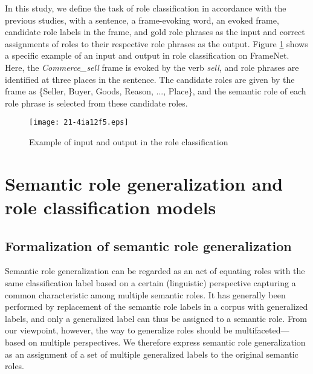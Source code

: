 \documentclass[english]{jnlp_1.4_rep}
\begin{document}
In this study, we define the task of role classification in accordance with the previous studies, with a sentence, a frame-evoking word, an evoked frame, candidate role labels in the frame, and gold role phrases as the input and correct assignments of roles to their respective role phrases as the output.
Figure \ref{fig:input} shows a specific example of an input and output in role classification on FrameNet. Here, the {\it Commerce\_sell} frame is evoked by the verb {\it sell}, and role phrases are identified at three places in the sentence. The candidate roles are given by the frame as \{{\sf Seller}, {\sf Buyer}, {\sf Goods}, {\sf Reason}, ..., {\sf Place}\}, and the semantic role of each role phrase is selected from these candidate roles.

\begin{figure}[t]
\begin{center}
\texttt{[image: 21-4ia12f5.eps]}
\end{center}
\caption{Example of input and output in the role classification}
\label{fig:input}
\end{figure}


\section{Semantic role generalization and role classification models}

\subsection{Formalization of semantic role generalization}
\label{sec:define-generalization}

Semantic role generalization can be regarded as an act of equating roles with the same classification label based on a certain (linguistic) perspective capturing a common characteristic among multiple semantic roles. It has generally been performed by replacement of the semantic role labels in a corpus with generalized labels, and only a generalized label can thus be assigned to a semantic role. From our viewpoint, however, the way to generalize roles should be multifaceted---based on multiple perspectives. We therefore express semantic role generalization as an assignment of a set of multiple generalized labels to the original semantic roles.
\end{document}
